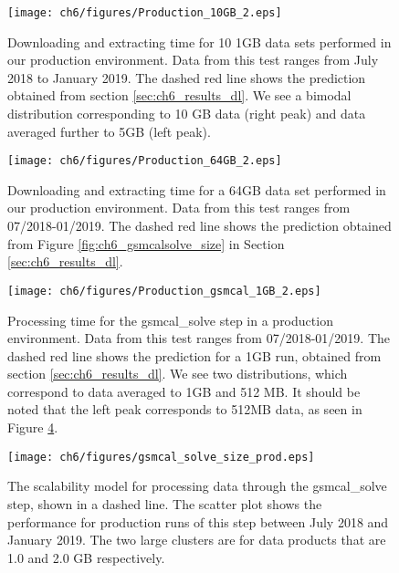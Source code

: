 \begin{figure}
    \texttt{[image: ch6/figures/Production\_10GB\_2.eps]}
      \caption[Tet of download/extract times for 10 1GB data sets]{Downloading and extracting time for 10 1GB data sets performed in our production environment. Data from this test ranges from July 2018 to January 2019. The dashed red line shows the prediction obtained from section \ref{sec:ch6_results_dl}. We see a bimodal distribution corresponding to 10 GB data (right peak) and data averaged further to 5GB (left peak).}
	\label{fig:ch6_prod_dl_10}
\end{figure}


\begin{figure}
    \texttt{[image: ch6/figures/Production\_64GB\_2.eps]}
      \caption[Tet of download/extract times for a 64GB data set]{Downloading and extracting time for a 64GB data set performed in our production environment. Data from this test ranges from 07/2018-01/2019. The dashed red line shows the prediction obtained from Figure \ref{fig:ch6_gsmcalsolve_size} in Section \ref{sec:ch6_results_dl}. }
	\label{fig:ch6_prod_dl_64}
\end{figure}


\begin{figure}
    \texttt{[image: ch6/figures/Production\_gsmcal\_1GB\_2.eps]}
      \caption[Processing time for the {\selectfont gsmcal\_solve} step in a production environment]{Processing time for the {\selectfont gsmcal\_solve} step in a production environment. Data from this test ranges from 07/2018-01/2019. The dashed red line shows the prediction for a 1GB run, obtained from section \ref{sec:ch6_results_dl}. We see two distributions, which correspond to data averaged to 1GB and 512 MB.  It should be noted that the left peak corresponds to 512MB data, as seen in Figure \ref{fig:ch6_prod_gsmcal_times}.}
	\label{fig:ch6_prod_gsmcal}
\end{figure}


\begin{figure}
    \texttt{[image: ch6/figures/gsmcal\_solve\_size\_prod.eps]}
      \caption[Comparison of scalability model with production runs]{The scalability model for processing data through the {\selectfont gsmcal\_solve} step, shown in a dashed line. The scatter plot shows the performance for production runs of this step between July 2018 and January 2019. The two large clusters are for data products that are 1.0 and 2.0 GB respectively. }
	\label{fig:ch6_prod_gsmcal_times}
\end{figure}


